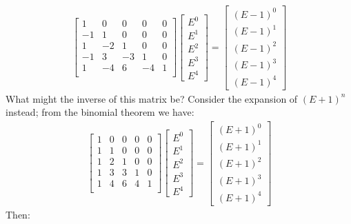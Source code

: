 \documentclass{article}
\renewcommand\({\left(}
\renewcommand\){\right)}
\begin{document}
\begin{align*}
    \begin{bmatrix}
 1 & 0 & 0 & 0 & 0 \\
 -1 & 1 & 0 & 0 & 0 \\
 1 & -2 & 1 & 0 & 0 \\
 -1 & 3 & -3 & 1 & 0 \\
 1 & -4 & 6 & -4 & 1 \\
    \end{bmatrix}
    \begin{bmatrix}E^0\\E^1\\E^2\\E^3\\E^4\end{bmatrix}=\begin{bmatrix}(E-1)^0\\(E-1)^1\\(E-1)^2\\(E-1)^3\\(E-1)^4\end{bmatrix}
\end{align*}
What might the inverse of this matrix be? Consider the expansion of $(E+1)^n$ instead; from the binomial theorem we have:
\begin{align*}
    \begin{bmatrix}
 1 & 0 & 0 & 0 & 0 \\
 1 & 1 & 0 & 0 & 0 \\
 1 & 2 & 1 & 0 & 0 \\
 1 & 3 & 3 & 1 & 0 \\
 1 & 4 & 6 & 4 & 1 \\
    \end{bmatrix}
    \begin{bmatrix}E^0\\E^1\\E^2\\E^3\\E^4\end{bmatrix}=\begin{bmatrix}(E+1)^0\\(E+1)^1\\(E+1)^2\\(E+1)^3\\(E+1)^4\end{bmatrix}
\end{align*}
Then:
\end{document}
